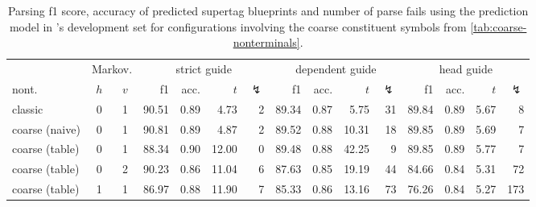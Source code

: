 \documentclass[../../document.tex]{subfiles}
\begin{document}
    \begin{table}
        \caption{\label{tbl:gridsearch:coarse:3}
        Parsing f1 score, accuracy of predicted supertag blueprints and number of parse fails using the  prediction model in \negra{}'s development set for configurations involving the coarse constituent symbols from \cref{tab:coarse-nonterminals}.
        }
        \centering
        \vspace{.2cm}
        \setlength{\tabcolsep}{3.5pt}
        \begin{tabular}{lcc|rrrr|rrrr|rrrr}
            \toprule
    & \multicolumn{2}{c|}{Markov.}         & \multicolumn{4}{c|}{strict guide} &  \multicolumn{4}{c|}{dependent guide} &  \multicolumn{4}{c}{head guide} \\
    nont.           & \(h\) & \(v\) & f1 & acc. & $t$ & $\lightning$ & f1 & acc. & $t$ & $\lightning$  & f1 & acc. & $t$ & $\lightning$  \\ \hline\rowcolor{black!10}
classic        & 0 & 1 & 90.51 & 0.89 &  4.73 & 2 & 89.34 & 0.87 &  5.75 & 31 & 89.84 & 0.89 & 5.67 & 8 \\\rowcolor{black!10}
coarse (naive) & 0 & 1 & 90.81 & 0.89 &  4.87 & 2 & 89.52 & 0.88 & 10.31 & 18 & 89.85 & 0.89 & 5.69 & 7 \\\hline
coarse (table) & 0 & 1 & 88.34 & 0.90 & 12.00 & 0 & 89.48 & 0.88 & 42.25 &  9 & 89.85 & 0.89 & 5.77 & 7 \\
coarse (table) & 0 & 2 & 90.23 & 0.86 & 11.04 & 6 & 87.63 & 0.85 & 19.19 & 44 & 84.66 & 0.84 & 5.31 & 72 \\
coarse (table) & 1 & 1 & 86.97 & 0.88 & 11.90 & 7 & 85.33 & 0.86 & 13.16 & 73 & 76.26 & 0.84 & 5.27 & 173 \\
\bottomrule
        \end{tabular}
    \end{table}
    
\end{document}
